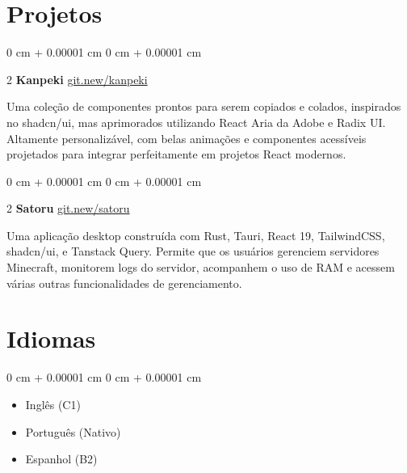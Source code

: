 \documentclass[10pt, letterpaper]{article}
\newenvironment{highlights}{ \begin{itemize}[ topsep=0.10 cm, parsep=0.10 cm, partopsep=0pt,
itemsep=0pt, leftmargin=0 cm + 10pt ] }{ \end{itemize} } %
\newenvironment{onecolentry}{ \begin{adjustwidth}{ 0 cm + 0.00001 cm }{ 0 cm + 0.00001 cm }
}{ \end{adjustwidth} } %
\newenvironment{twocolentry}[2][]{ \onecolentry \def\secondColumn{#2} \setcolumnwidth{\fill, 4.5 cm}
\begin{paracol}{2} }{ \switchcolumn \raggedleft \secondColumn \end{paracol}
\endonecolentry } %
\begin{document}
	\section{Projetos}

	\begin{twocolentry}
		{\href{https://git.new/kanpeki}{git.new/kanpeki}} \textbf{Kanpeki}
	\end{twocolentry}

	\vspace{0.10cm}
	Uma coleção de componentes prontos para serem copiados e colados, inspirados no shadcn/ui, mas aprimorados utilizando
	React Aria da Adobe e Radix UI. Altamente personalizável, com belas
	animações e componentes acessíveis projetados para integrar perfeitamente em
	projetos React modernos.

	\vspace{0.2cm}

	\begin{twocolentry}
		{\href{https://git.new/satoru}{git.new/satoru}} \textbf{Satoru}
	\end{twocolentry}

	\vspace{0.10cm}
	Uma aplicação desktop construída com Rust, Tauri, React 19, TailwindCSS, shadcn/ui,
	e Tanstack Query. Permite que os usuários gerenciem servidores Minecraft, monitorem logs do servidor,
	acompanhem o uso de RAM e acessem várias outras funcionalidades de gerenciamento.

	\section{Idiomas}

	\begin{onecolentry}
		\begin{highlights}
			\item Inglês (C1)
			\item Português (Nativo)
			\item Espanhol (B2)
		\end{highlights}
	\end{onecolentry}
\end{document}

